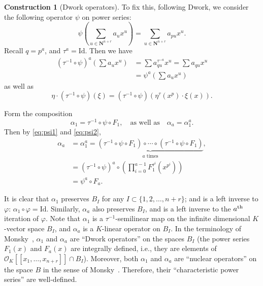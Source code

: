 \documentclass{amsart}
\numberwithin{equation}{section}
\theoremstyle{plain}
\theoremstyle{definition}
\newtheorem{construction}[equation]{Construction}
\renewcommand{\mathbb}{\mathbf}
\begin{document}
\begin{construction}[Dwork operators]\label{construction:dwork-operator}
To fix this, following Dwork, we
consider the following operator  \(\psi\) on power series:
\begin{equation}\label{eq:psi1}
\psi\left( \sum_{u\in \mathbb{N}^{n+r}} a_{u} x^{u} \right) = \sum_{u\in \mathbb{N}^{n+r}} a_{pu} x^{u}.
\end{equation}
Recall \(q=p^{a}\), and \(\tau^{a} = \mathrm{Id}\).  Then we have
\begin{align}\label{eq:psi2}
(\tau^{-1}\circ \psi)^{a}\left( \sum a_{u}x^{u} \right)
  &= \sum a_{qu}^{\tau^{-a}} x^{u} = \sum a_{qu}x^{u} \\
  &= \psi^{a}\left( \sum a_{u}x^{u} \right)\nonumber
\end{align}
as well as
\begin{equation*}
\eta \cdot  (\tau^{-1} \circ \psi)(\xi)
= (\tau^{-1}\circ\psi)(\eta^{\tau}(x^{p}) \cdot \xi(x)).
\end{equation*}

Form the composition
\begin{equation*}
\alpha_{1} = \tau^{-1} \circ \psi \circ F_{1}, \quad\text{as well as}\quad
\alpha_{a} = \alpha_{1}^{a}.
\end{equation*}
Then by \eqref{eq:psi1} and \eqref{eq:psi2},
\begin{align*}
  \alpha_{a} &= \alpha_{1}^{a}
  = \underbrace{(\tau^{-1} \circ \psi \circ F_{1}) \circ \cdots \circ(\tau^{-1} \circ \psi \circ F_{1})}_{a\text{ times}}, \\
  &= (\tau^{-1} \circ \psi)^{a}\circ \left( \prod_{i=0}^{a-1} F_{1}^{\tau^{i}}(x^{p^{i}}) \right) \\
  &= \psi^{a} \circ F_{a}.
\end{align*}


It is clear that \(\alpha_{1}\) preserves \(B_{I}\) for any \(I \subset \{1,2,\ldots,n+r\}\); and is a left inverse to
\(\varphi\): \(\alpha_{1}\circ\varphi = \mathrm{Id}\).  Similarly,
\(\alpha_{a}\) also preserves \(B_{I}\), and is a left inverse to the
\(a\textsuperscript{th}\) iteration of \(\varphi\).  Note that
\(\alpha_{1}\) is a \(\tau^{-1}\)-semilinear map on the infinite
dimensional \(K\)-vector space \(B_{I}\), and \(\alpha_{a}\) is a \(K\)-linear
operator on \(B_{I}\).  In the terminology of
Monsky~\cite[Definition~2.1]{monsky:formal-cohomology-3},
\(\alpha_{1}\) and \(\alpha_{a}\) are ``Dwork operators'' on the spaces
\(B_{I}\)
(the power series \(F_{1}(x)\) and \(F_{a}(x)\) are integrally defined, i.e., they are elements of
\(\mathcal{O}_{K}[\![x_{1},\ldots,x_{n+r}]\!] \cap B_{I}\)).  Moreover, both \(\alpha_{1}\) and
\(\alpha_{a}\) are ``nuclear operators'' on the space
\(B\) in the sense of Monsky~\cite[Theorem~2.1]{monsky:formal-cohomology-3}.  Therefore,
their ``characteristic power series'' \cite[Theorem~1.2]{monsky:formal-cohomology-3}
are well-defined.


\end{construction}
\end{document}
